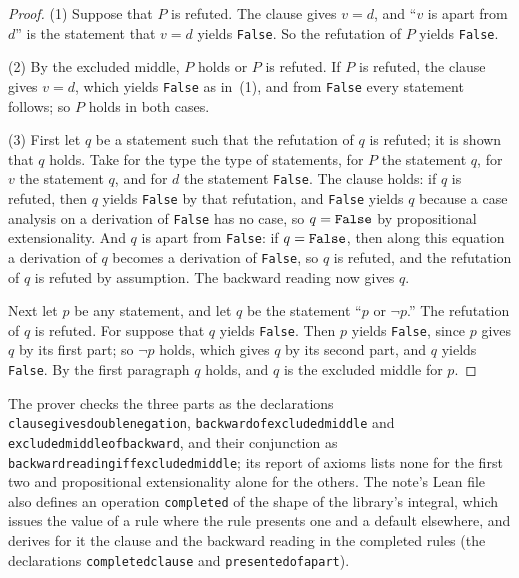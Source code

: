 \documentclass[11pt]{article}
\theoremstyle{definition}
\theoremstyle{remark}
\DeclareRobustCommand{\lean}[1]{{\renewcommand{\_}{\textunderscore\allowbreak}\texttt{#1}}}
\newcommand{\False}{\lean{False}}
\begin{document}
\begin{proof}
(1) Suppose that $P$ is refuted. The clause gives $v=d$, and ``$v$ is apart from $d$'' is the statement that $v=d$ yields \False. So the refutation of $P$ yields \False.

(2) By the excluded middle, $P$ holds or $P$ is refuted. If $P$ is refuted, the clause gives $v=d$, which yields \False{} as in~(1), and from \False{} every statement follows; so $P$ holds in both cases.

(3) First let $q$ be a statement such that the refutation of $q$ is refuted; it is shown that $q$ holds. Take for the type the type of statements, for $P$ the statement $q$, for $v$ the statement $q$, and for $d$ the statement \False. The clause holds: if $q$ is refuted, then $q$ yields \False{} by that refutation, and \False{} yields $q$ because a case analysis on a derivation of \False{} has no case, so $q=\False$ by propositional extensionality. And $q$ is apart from \False: if $q=\False$, then along this equation a derivation of $q$ becomes a derivation of \False, so $q$ is refuted, and the refutation of $q$ is refuted by assumption. The backward reading now gives $q$.

Next let $p$ be any statement, and let $q$ be the statement ``$p$ or $\neg p$.'' The refutation of $q$ is refuted. For suppose that $q$ yields \False. Then $p$ yields \False, since $p$ gives $q$ by its first part; so $\neg p$ holds, which gives $q$ by its second part, and $q$ yields \False. By the first paragraph $q$ holds, and $q$ is the excluded middle for $p$.
\end{proof}

\noindent The prover checks the three parts as the declarations \lean{clause\_gives\_double\_negation}, \lean{backward\_of\_excluded\_middle} and \lean{excluded\_middle\_of\_backward}, and their conjunction as \lean{backward\_reading\_iff\_excluded\_middle}; its report of axioms lists none for the first two and propositional extensionality alone for the others. The note's Lean file also defines an operation \lean{completed} of the shape of the library's integral, which issues the value of a rule where the rule presents one and a default elsewhere, and derives for it the clause and the backward reading in the completed rules (the declarations \lean{completed\_clause} and \lean{presented\_of\_apart}).
\end{document}
